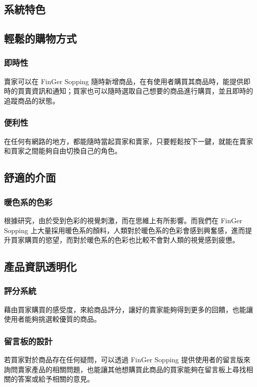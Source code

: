 \documentclass{scrreprt}
\begin{document}
\begin{CJK}{UTF8}{bkai}
\chapter{系統特色}
\section{輕鬆的購物方式}

\subsection{即時性}
\qquad 賣家可以在 FinGer Sopping 隨時新增商品，在有使用者購買其商品時，能提供即時的買賣資訊和通知；買家也可以隨時選取自己想要的商品進行購買，並且即時的追蹤商品的狀態。

\subsection{便利性}
\qquad 在任何有網路的地方，都能隨時當起買家和賣家，只要輕鬆按下一鍵，就能在賣家和買家之間能夠自由切換自己的角色。


\section{舒適的介面}

\subsection{暖色系的色彩}
\qquad 根據研究，由於受到色彩的視覺刺激，而在思維上有所影響。而我們在 FinGer Sopping 上大量採用暖色系的顏料，人類對於暖色系的色彩會感到興奮感，進而提升買家購買的慾望，而對於暖色系的色彩也比較不會對人類的視覺感到疲憊。

\section{產品資訊透明化}
\subsection{評分系統}
\qquad 藉由買家購買的感受度，來給商品評分，讓好的賣家能夠得到更多的回饋，也能讓使用者能夠挑選較優質的商品。

\subsection{留言板的設計}
\qquad 若買家對於商品存在任何疑問，可以透過 FinGer Sopping 提供使用者的留言版來詢問賣家產品的相關問題，也能讓其他想購買此商品的買家能夠在留言板上尋找相關的答案或給予相關的意見。


\end{CJK}
\end{document}
